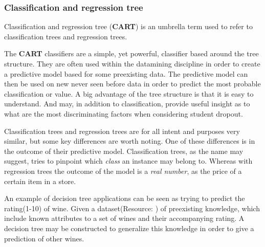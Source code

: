 \subsubsection{Classification and regression tree}\label{sec:tree}
	Classification and regression tree (\textbf{CART}) is an umbrella term used to refer to
	classification trees and regression trees.\cite{trees:umbrella}

	\bigskip\noindent The \textbf{CART} classifiers are a simple, yet powerful, classifier based around the tree structure. 
	They are often used within the datamining discipline in order to create a predictive model based for some preexisting data.
	The predictive model can then be used on new never seen before data in order to predict the most probable classification or value. 
	A big advantage of the tree structure is that it is easy to understand. 
	And may, in addition to classification, provide useful insight as to what are the most discriminating factors when considering student dropout. 
	
	\bigskip\noindent Classification trees and regression trees are for all intent and purposes very similar, but some key differences are worth noting. 
	One of these differences is in the outcome of their predictive model. 
	Classification trees, as the name may suggest, tries to pinpoint which \textit{class} an instance may belong to. 
	Whereas with regression trees the outcome of the model is a \textit{real number}, as the price of a certain item in a store. 
	
	\bigskip\noindent
	An example of decision tree applications can be seen as trying to predict the rating(1-10) of wine. 
	Given a dataset(Resource: \cite{mining:datasetexample}) of preexisting knowledge, which include known attributes to a set of wines and their accompanying rating.
	A decision tree may be constructed to generalize this knowledge in order to give a prediction of other wines. 	
		
	

